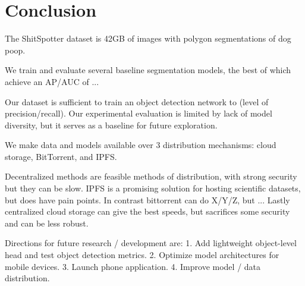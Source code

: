 \documentclass[10pt,twocolumn,letterpaper]{article}
\begin{document}
\section{Conclusion}

The ShitSpotter dataset is 42GB of images with polygon segmentations of dog
poop. 

We train and evaluate several baseline segmentation models, the best of which 
achieve an AP/AUC of ...

Our dataset is sufficient to train an object detection network to (level of
precision/recall).
Our experimental evaluation is limited by lack of model diversity, but it
serves as a baseline for future exploration.

We make data and models available over 3 distribution mechanisms: 
cloud storage, BitTorrent, and IPFS.

Decentralized methods are feasible methods of distribution, with strong
security but they can be slow.
IPFS is a promising solution for hosting scientific datasets, but does have pain points.
In contrast bittorrent can do X/Y/Z, but ...
Lastly centralized cloud storage can give the best speeds, but sacrifices some
security and can be less robust.

Directions for future research / development are:
1. Add lightweight object-level head and test object detection metrics.
2. Optimize model architectures for mobile devices.
3. Launch phone application.
4. Improve model / data distribution.


{\small


}
%
\end{document}
